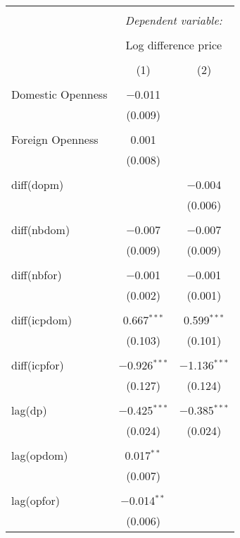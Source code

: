 
\begin{tabular}{@{\extracolsep{5pt}}lcc} 
\\[-1.8ex]\hline 
\hline \\[-1.8ex] 
 & \multicolumn{2}{c}{\textit{Dependent variable:}} \\ 
\cline{2-3} 
\\[-1.8ex] & \multicolumn{2}{c}{Log difference price} \\ 
\\[-1.8ex] & (1) & (2)\\ 
\hline \\[-1.8ex] 
 Domestic Openness & $-$0.011 &  \\ 
  & (0.009) &  \\ 
  & & \\ 
 Foreign Openness & 0.001 &  \\ 
  & (0.008) &  \\ 
  & & \\ 
 diff(dopm) &  & $-$0.004 \\ 
  &  & (0.006) \\ 
  & & \\ 
 diff(nbdom) & $-$0.007 & $-$0.007 \\ 
  & (0.009) & (0.009) \\ 
  & & \\ 
 diff(nbfor) & $-$0.001 & $-$0.001 \\ 
  & (0.002) & (0.001) \\ 
  & & \\ 
 diff(icpdom) & 0.667$^{***}$ & 0.599$^{***}$ \\ 
  & (0.103) & (0.101) \\ 
  & & \\ 
 diff(icpfor) & $-$0.926$^{***}$ & $-$1.136$^{***}$ \\ 
  & (0.127) & (0.124) \\ 
  & & \\ 
 lag(dp) & $-$0.425$^{***}$ & $-$0.385$^{***}$ \\ 
  & (0.024) & (0.024) \\ 
  & & \\ 
 lag(opdom) & 0.017$^{**}$ &  \\ 
  & (0.007) &  \\ 
  & & \\ 
 lag(opfor) & $-$0.014$^{**}$ &  \\ 
  & (0.006) &  \\ 

\end{tabular}
